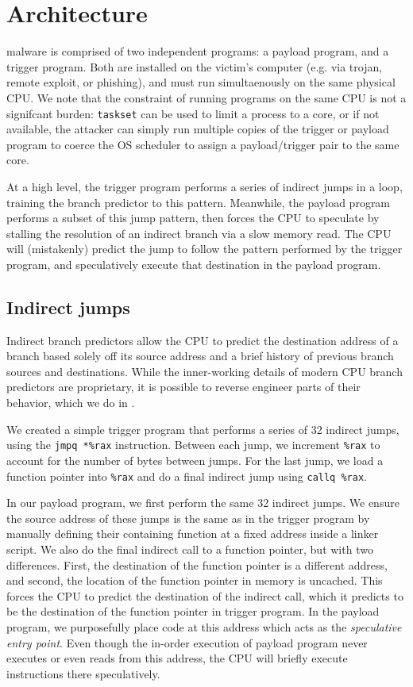 

\section{Architecture}


\speculake malware is comprised of two independent programs: a payload program, and a
trigger program. Both are installed on the victim's computer (e.g. via trojan, remote
exploit, or phishing), and must run simultaenously on the same physical CPU. We
note that the constraint of running programs on the same CPU is not a signifcant
burden: \texttt{taskset} can be used to limit a process to a core, or if not
available, the attacker can simply run multiple copies of the trigger or payload
program to coerce the OS scheduler to assign a payload/trigger pair to the same
core.

At a high level, the trigger program performs a series of indirect jumps in a
loop, training the branch predictor to this pattern. Meanwhile, the
payload program performs a subset of this jump pattern, then forces the CPU to
speculate by stalling the resolution of an indirect branch via a slow memory
read. The CPU will (mistakenly) predict the jump to follow the pattern performed
by the trigger program, and speculatively execute that destination in the
payload program.

\subsection{Indirect jumps}

Indirect branch predictors allow the CPU to predict the destination address of a
branch based solely off its source address and a brief history of previous
branch sources and destinations. While the inner-working details of modern CPU
branch predictors are proprietary, it is possible to reverse engineer parts of
their behavior, which we do in \speculake.

We created a simple trigger program that performs a series of 32 indirect jumps,
using the \texttt{jmpq *\%rax} instruction. Between each jump, we increment
\texttt{\%rax} to account for the number of bytes between jumps. For the last
jump, we load a function pointer into \texttt{\%rax} and do a final indirect
jump using \texttt{callq \%rax}.


In our payload program, we first perform the same 32 indirect jumps. We ensure
the source address of these jumps is the same as in the trigger program by
manually defining their containing function at a fixed address inside a linker
script. We also do the final indirect call to a function pointer, but with two
differences. First, the destination of the function pointer is a different
address, and second, the location of the function pointer in memory is uncached.
This forces the CPU to predict the destination of the indirect call, which it
predicts to be the destination of the function pointer in trigger program. In
the payload program, we purposefully place code at this address which acts as
the \emph{speculative entry point}. Even though the in-order execution of
payload program never executes or even reads from this address, the CPU will
briefly execute instructions there speculatively.

